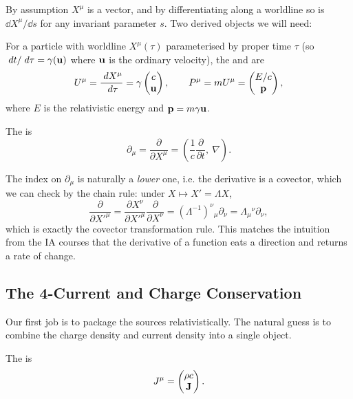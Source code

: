 \documentclass[a4paper]{scrartcl}
\begin{document}
By assumption $X^\mu$ is a vector, and by differentiating along a worldline so is $\dd X^\mu/\dd s$ for any invariant parameter $s$. Two derived objects we will need:

\begin{definition}
	For a particle with worldline $X^\mu(\tau)$ parameterised by proper time $\tau$ (so $\; d t/\; d \tau = \gamma(\mathbf{u})$ where $\mathbf{u}$ is the ordinary velocity), the  and  are
	$$
	U^\mu = \frac{\; d X^\mu}{\; d \tau} = \gamma \begin{pmatrix} c \\ \mathbf{u}\end{pmatrix}, \qquad P^\mu = m U^\mu = \begin{pmatrix} E/c\\ \mathbf{p}\end{pmatrix},
	$$
	where $E$ is the relativistic energy and $\mathbf{p} = m\gamma\mathbf{u}$.
\end{definition}

\begin{definition}[4-derivative]
	The  is
	$$
	\partial_\mu = \frac{\partial}{\partial X^\mu} = \left(\frac{1}{c}\frac{\partial}{\partial t},\ \nabla\right).
	$$
\end{definition}

The index on $\partial_\mu$ is naturally a \emph{lower} one, i.e. the derivative is a covector, which we can check by the chain rule: under $X\mapsto X' = \Lambda X$,
$$
\frac{\partial}{\partial X'^\mu} = \frac{\partial X^\nu}{\partial X'^\mu}\frac{\partial}{\partial X^\nu} = (\Lambda^{-1})^\nu{}_\mu \partial_\nu = \Lambda_\mu{}^\nu\partial_\nu,
$$
which is exactly the covector transformation rule. This matches the intuition from the IA courses that the derivative of a function eats a direction and returns a rate of change.

\subsection{The 4-Current and Charge Conservation}

Our first job is to package the sources relativistically. The natural guess is to combine the charge density and current density into a single object.

\begin{definition}[4-current]
	The  is
	$$
	J^\mu = \begin{pmatrix} \rho c\\ \mathbf{J}\end{pmatrix}.
	$$
\end{definition}
\end{document}
